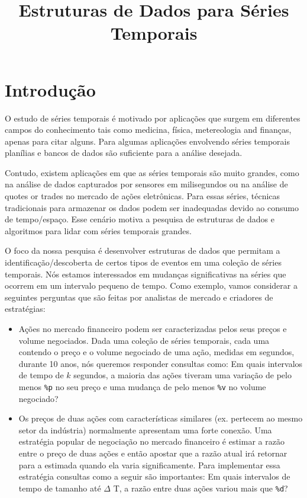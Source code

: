 \documentclass[12pt]{article}
\begin{document}
\nocite{*}

\title{Estruturas de Dados para Séries Temporais}

\maketitle

\section{Introdução}

O estudo de séries temporais é motivado por aplicações que surgem 
em diferentes campos do conhecimento tais como medicina, física, metereologia
and finanças, apenas para citar alguns. Para algumas aplicações envolvendo
séries temporais planílias e bancos de dados são suficiente para a análise
desejada. 

Contudo, existem aplicações em que as séries temporais são muito grandes,
como na análise de dados capturados por sensores em milisegundos ou na
análise de quotes or trades no mercado de ações eletrônicas. Para essas
séries, técnicas tradicionais para armazenar os dados podem ser inadequadas
devido ao consumo de tempo/espaço. Esse cenário motiva a pesquisa de estruturas
de dados e algoritmos para lidar com séries temporais grandes\cite{lala}.

O foco da nossa pesquisa é desenvolver estruturas de dados que permitam
a identificação/descoberta de certos tipos de eventos em uma coleção
de séries temporais. Nós estamos interessados em mudanças significativas
na séries que ocorrem em um intervalo pequeno de tempo. Como exemplo,
vamos considerar a seguintes perguntas que são feitas por analistas
de mercado e criadores de estratégias:

\begin{itemize}
\item Ações no mercado financeiro podem ser caracterizadas pelos seus
preços e volume negociados. Dada uma coleção de séries temporais, cada
uma contendo o preço e o volume negociado de uma ação, medidas em segundos,
durante 10 anos, nós queremos responder consultas como: Em quais intervalos
de tempo de $k$ segundos, a maioria das ações tiveram uma variação de pelo
menos \verb|%p| no seu preço e uma mudança de pelo menos \verb|%v| no volume
negociado?

\item Os preços de duas ações com características similares (ex. pertecem
ao mesmo setor da indústria) normalmente apresentam uma forte conexão. Uma
estratégia popular de negociação no mercado financeiro é estimar a razão
entre o preço de duas ações e então apostar que a razão atual irá
retornar para a estimada quando ela varia significamente. Para implementar
essa estratégia consultas como a seguir são importantes: Em quais intervalos
de tempo de tamanho até $\Delta$ T, a razão entre duas ações variou mais que
\verb|%d|?

\end{itemize}
\end{document}
